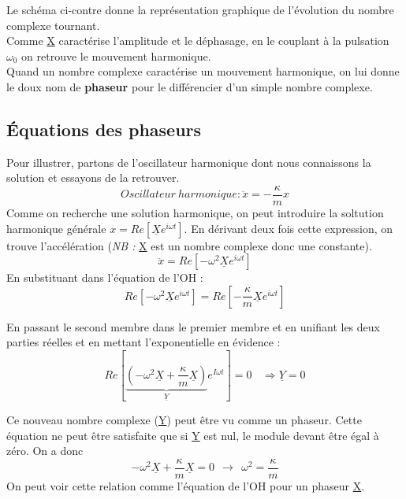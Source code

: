 \documentclass	[11pt, a4paper, openany]{book}
\begin{document}
	Le schéma ci-contre donne la représentation graphique de l'évolution du nombre complexe tournant.\\
	
	Comme \underline{X} caractérise l'amplitude et le déphasage, en le couplant à la pulsation $\omega_0$ on retrouve le mouvement harmonique.\\
	
	Quand un nombre complexe caractérise un mouvement harmonique, on lui donne le doux nom de \textbf{phaseur} pour le différencier d'un simple nombre complexe.
	
	\subsection{Équations des phaseurs}
	Pour illustrer, partons de l'oscillateur harmonique dont nous connaissons la solution et essayons de la retrouver.
	\begin{equation}
		Oscillateur\ harmonique : \ddot{x} = -\frac{\kappa}{m}x
	\end{equation}
	Comme on recherche une solution harmonique, on peut introduire la soltution harmonique générale $x = Re\left[\underline{X}e^{i\omega t}\right]$. En dérivant deux fois cette expression, on trouve l'accélération (\textit{NB :} \underline{X} est un nombre complexe donc une constante).
	\begin{equation}
		\ddot{x} = Re\left[-\omega^2 \underline{X}e^{i\omega t}\right]
	\end{equation}
	En substituant dans l'équation de l'OH :
	\begin{equation}
		Re\left[-\omega^2 \underline{X}e^{i\omega t}\right] = Re\left[-\frac{\kappa}{m}\underline{X}e^{i\omega t}\right]
	\end{equation}
	
	En passant le second membre dans le premier membre et en unifiant les deux parties réelles et en mettant l'exponentielle en évidence :
	\begin{equation}
		Re\left[\underbrace{(-\omega^2\underline{X} + \frac{\kappa}{m}\underline{X})}_{\underline{Y}}e^{I\omega t}\right] = 0\ \ \ \ \Rightarrow \underline{Y} = 0
	\end{equation}
	
	Ce nouveau nombre complexe (\underline{Y}) peut être vu comme un phaseur. Cette équation ne peut être satisfaite que si \underline{Y} est nul, le module devant être égal à zéro. On a donc 
	\begin{equation}
		-\omega^2 \underline{X} + \frac{\kappa}{m}\underline{X} = 0\ \ \rightarrow\ \  \omega^2 = \frac{\kappa}{m}
	\end{equation}
	On peut voir cette relation comme l'équation de l'OH pour un phaseur \underline{X}.
	
\end{document}
